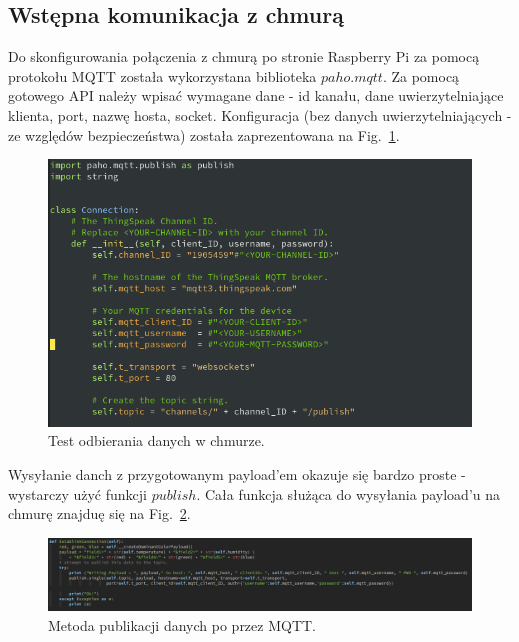 \documentclass{article}
\begin{document}
\subsection{Wstępna komunikacja z chmurą}
Do skonfigurowania połączenia z chmurą po stronie Raspberry Pi za pomocą protokołu MQTT została wykorzystana biblioteka $paho.mqtt$.
Za pomocą gotowego API należy wpisać wymagane dane - id kanału, dane uwierzytelniające klienta, port, nazwę hosta, socket.
Konfiguracja (bez danych uwierzytelniających - ze względów bezpieczeństwa) została zaprezentowana na Fig.~\ref{fig:1}.
\begin{figure}
  \centering
  \includegraphics[width=\textwidth]{kod.png}
  \caption{Test odbierania danych w chmurze.} 
  \label{fig:1}    
\end{figure}

Wysyłanie danch z przygotowanym payload'em okazuje się bardzo proste - wystarczy użyć funkcji $publish$. Cała funkcja służąca do wysyłania payload'u na chmurę znajduę się na Fig.~\ref{fig:chm}.
\begin{figure}
  \centering
  \includegraphics[width=\textwidth]{chm.png}
  \caption{Metoda publikacji danych po przez MQTT.}
  \label{fig:chm}    
\end{figure}
\end{document}
